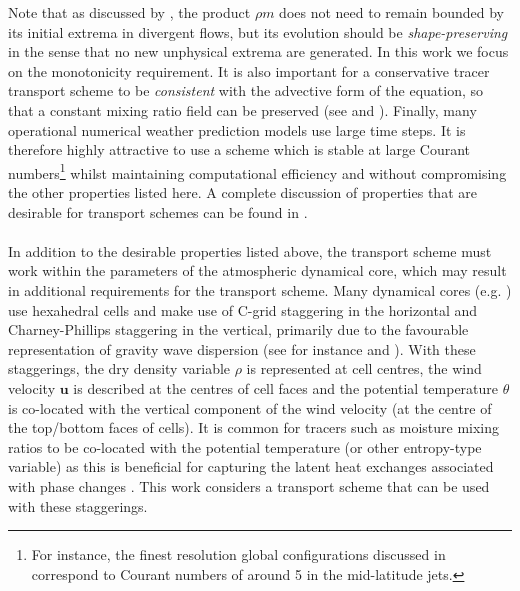 \documentclass[11pt,a4paper]{article}
\begin{document}
Note that as discussed by \citet{lauritzen2011numerical}, the product $\rho m$ does not need to remain bounded by its initial extrema in divergent flows, but its evolution should be \textit{shape-preserving} in the sense that no new unphysical extrema are generated.
In this work we focus on the monotonicity requirement.
It is also important for a conservative tracer transport scheme to be \textit{consistent} with the advective form of the equation, so that a constant mixing ratio field can be preserved (see \citep{jockel2001fundamental} and \citep{zhang2008consistency}).
Finally, many operational numerical weather prediction models use large time steps.
It is therefore highly attractive to use a scheme which is stable at large Courant numbers\footnote{For instance, the finest resolution global configurations discussed in \citet{walters2019met} correspond to Courant numbers of around 5 in the mid-latitude jets.}
whilst maintaining computational efficiency and without compromising the other properties listed here.
A complete discussion of properties that are desirable for transport schemes can be found in \citet{lauritzen2011numerical}.
\\
\\
In addition to the desirable properties listed above, the transport scheme must work within the parameters of the atmospheric dynamical core, which may result in additional requirements for the transport scheme.
Many dynamical cores (e.g. \citep{chen2008new,wood2014inherently,girard2014staggered,melvin2024mixed}) use hexahedral cells and make use of C-grid staggering in the horizontal and Charney-Phillips staggering \citep{charney1953verticalstaggering} in the vertical, primarily due to the favourable representation of gravity wave dispersion (see for instance \citet{staniforth2012horizontal} and \citet{thuburn2022numerical}). 
With these staggerings, the dry density variable $\rho$ is represented at cell centres, the wind velocity $\bm{u}$ is described at the centres of cell faces and the potential temperature $\theta$ is co-located with the vertical component of the wind velocity (at the centre of the top/bottom faces of cells).
It is common for tracers such as moisture mixing ratios to be co-located with the potential temperature (or other entropy-type variable) as this is beneficial for capturing the latent heat exchanges associated with phase changes \citep{bendall2023solution}.
This work considers a transport scheme that can be used with these staggerings.
\end{document}
